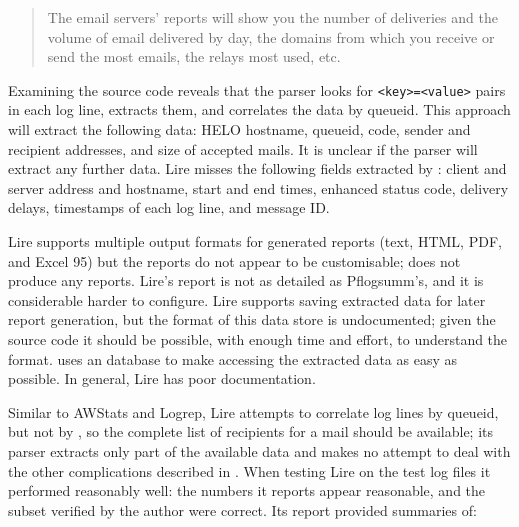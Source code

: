 \begin{quotation}

    \noindent{} The email servers' reports will show you the number of
    deliveries and the volume of email delivered by day, the domains from
    which you receive or send the most emails, the relays most used, etc.

\end{quotation}

\noindent{}Examining the source code reveals that the parser looks for
\texttt{<key>=<value>} pairs in each log line, extracts them, and
correlates the data by queueid.  This approach will extract the following
data: HELO hostname, queueid,  code, sender and recipient
addresses, and size of accepted mails.  It is unclear if the parser will
extract any further data.  Lire misses the following fields extracted by
\parsername{}: client and server  address and hostname, start
and end times, enhanced status code, delivery delays, timestamps of each
log line, and message ID\@.

Lire supports multiple output formats for generated reports (text, HTML,
PDF, and Excel 95) but the reports do not appear to be customisable;
\parsername{} does not produce any reports.  Lire's report is not as
detailed as Pflogsumm's, and it is considerable harder to configure.  Lire
supports saving extracted data for later report generation, but the format
of this data store is undocumented; given the source code it should be
possible, with enough time and effort, to understand the format.
\parsername{} uses an  database to make accessing the
extracted data as easy as possible.  In general, Lire has poor
documentation.

Similar to AWStats and Logrep, Lire attempts to correlate log lines by
queueid, but not by , so the complete list of recipients for a
mail should be available; its parser extracts only part of the available
data and makes no attempt to deal with the other complications described in
.  When testing Lire on the \numberOFlogFILES{}
test log files it performed reasonably well: the numbers it reports appear
reasonable, and the subset verified by the author were correct.  Its report
provided summaries of:

